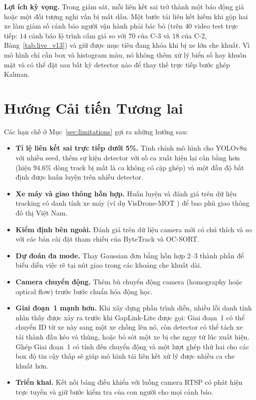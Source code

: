 \textbf{Lợi ích kỳ vọng.} Trong giám sát, mỗi liên kết sai trở thành một báo động giả hoặc một đối tượng nghi vấn bị mất dấu. Một bước tái liên kết hiếm khi gộp hai xe làm giảm số cảnh báo người vận hành phải bác bỏ (trên $40$ video test trực tiếp: $14$ cảnh báo lộ trình cấm giả so với $70$ của C-3 và $18$ của C-2, Bảng~\ref{tab:live_v13}) và giữ được mục tiêu đang khóa khi bị xe lớn che khuất. Vì mô hình chỉ cần box và histogram màu, nó không thêm xử lý biển số hay khuôn mặt và có thể đặt sau bất kỳ detector nào để thay thế trực tiếp bước ghép Kalman.

\section{Hướng Cải tiến Tương lai}
\label{sec:future_improvements}

Các hạn chế ở Mục~\ref{sec:limitations} gợi ra những hướng sau:
\begin{itemize}
    \item \textbf{Tỉ lệ liên kết sai trực tiếp dưới 5\%.} Tinh chỉnh mô hình cho YOLOv8n với nhiều seed, thêm sự kiện detector với số ca xuất hiện lại cân bằng hơn (hiện $94.6\%$ dòng track bị mất là ca không có cặp ghép) và một đầu độ bất định được huấn luyện trên nhiễu detector.
    \item \textbf{Xe máy và giao thông hỗn hợp.} Huấn luyện và đánh giá trên dữ liệu tracking có danh tính xe máy (ví dụ VisDrone-MOT \cite{zhu2021visdrone}) để bao phủ giao thông đô thị Việt Nam.
    \item \textbf{Kiểm định bên ngoài.} Đánh giá trên dữ liệu camera mới có chú thích và so với các bản cài đặt tham chiếu của ByteTrack và OC-SORT.
    \item \textbf{Dự đoán đa mode.} Thay Gaussian đơn bằng hỗn hợp 2--3 thành phần để biểu diễn việc rẽ tại nút giao trong các khoảng che khuất dài.
    \item \textbf{Camera chuyển động.} Thêm bù chuyển động camera (homography hoặc optical flow) trước bước chuẩn hóa động học.
    \item \textbf{Giai đoạn~1 mạnh hơn.} Khi xây dựng phần trình diễn, nhiều lỗi danh tính nhìn thấy được xảy ra trước khi GapLink-Lite được gọi: Giai đoạn~1 có thể chuyển ID từ xe này sang một xe chồng lên nó, còn detector có thể tách xe tải thành đầu kéo và thùng, hoặc bỏ sót một xe bị che ngay từ lúc xuất hiện. Ghép Giai đoạn~1 có tính đến chuyển động và một lượt ghép thứ hai cho các box độ tin cậy thấp sẽ giúp mô hình tái liên kết xử lý được nhiều ca che khuất hơn.
    \item \textbf{Triển khai.} Kết nối bảng điều khiển với luồng camera RTSP có phát hiện trực tuyến và giữ bước kiểm tra của con người cho mọi cảnh báo.
\end{itemize}
